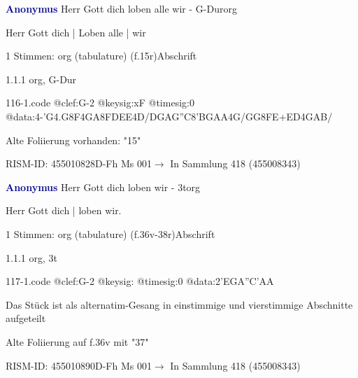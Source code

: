 \documentclass[twocolumn]{book}
\begin{document}
\par \vspace{7pt} \textcolor{darkblue}{\textbf{Anonymus  }}\hfillplus{\textbf{[116]}}\newline Herr Gott dich loben alle wir - G-Dur\newline org
\par \begin{itshape}[f.15r, at left:] Herr Gott dich | Loben alle | wir\end{itshape} 
\par \textcolor{darkblue}{}  1 Stimmen: org (tabulature)  (f.15r)\newline Abschrift
\par 1.1.1  org, G-Dur  
\begin{filecontents*}{116-1.code}
@clef:G-2
@keysig:xF
@timesig:0
@data:4-'G4.G8F4GA{8FDEE}4D/DGAG''C{8'BGAA}4G/GG{8FE+}{ED}4GAB/
\end{filecontents*}
\newline
%
\par Alte Foliierung vorhanden: "15"
\par RISM-ID: 455010828\newline D-Fh  Ms 001\newline $\rightarrow$ In Sammlung 418 (455008343)
      
\par \vspace{7pt} \textcolor{darkblue}{\textbf{Anonymus  }}\hfillplus{\textbf{[117]}}\newline Herr Gott dich loben wir - 3t\newline org
\par \begin{itshape}[f.36v, at left:] Herr Gott dich | loben wir.\end{itshape} 
\par \textcolor{darkblue}{}  1 Stimmen: org (tabulature)  (f.36v-38r)\newline Abschrift
\par 1.1.1  org, 3t  
\begin{filecontents*}{117-1.code}
@clef:G-2
@keysig:
@timesig:0
@data:2'EGA''C'AA
\end{filecontents*}
\newline
%
\par Das Stück ist als alternatim-Gesang in einstimmige und vierstimmige Abschnitte aufgeteilt
\par Alte Foliierung auf f.36v mit "37"
\par RISM-ID: 455010890\newline D-Fh  Ms 001\newline $\rightarrow$ In Sammlung 418 (455008343)
      
\end{document}
